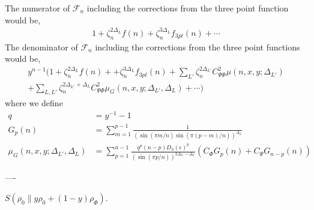 \documentclass[11pt]{article}
\newcommand{\ep}{\epsilon}
\newcommand{\mO}{\mathcal{O}}
\newcommand{\nn}{\nonumber}
\newcommand{\lb}{\left(}
\newcommand{\rb}{\right)}
\begin{document}
The numerator of $\mathcal{F}_n$ including the corrections from the three point function would be,
\begin{align}
    1 + \zeta_n^{2\Delta_L}f(n) + \zeta_n^{3\Delta_L}f_{3pt}(n) + \cdots
\end{align}
The denominator of $\mathcal{F}_n$ including the corrections from the three point functions would be,
\begin{align}
y^{n-1}\Bigg( 1+ \zeta_n^{2\Delta_L} f(n)  + + \zeta_n^{3\Delta_L}f_{3pt}(n) + \sum_{L'} \zeta_n^{2\Delta_{L'} } C_{\Psi \Phi}^2 \mu(n,x,y;\Delta_{L'}) \nn\\
+ \sum_{L,L'}\zeta_n^{2\Delta_{L'} + \Delta_L}C^2_{\Psi\Phi} \mu_G(n,x,y;\Delta_{L'},\Delta_L)+\cdots\Bigg)
\end{align}
where we define
\begin{align}
    q &= y^{-1}-1 \\
    G_p(n) &= \sum_{m=1}^{p-1} \frac{1}{\lb \sin(\pi m/n) \sin(\pi (p-m)/n)\rb^{\Delta_L}}\\
    \mu_G (n,x,y;\Delta_{L'},\Delta_L) &= \sum_{p=1}^{n-1}   \frac{q^p (n-p)D_n(\ep)^{p}}{\lb \sin(\pi p/n)\rb^{2\Delta_{L'}-\Delta_L}} \lb C_\Phi G_p(n) + C_\Psi G_{n-p}(n)\rb
\end{align}

----

$S(\rho_0 \| y\rho_0 + (1-y)\rho_\Phi)$. 
\end{document}
